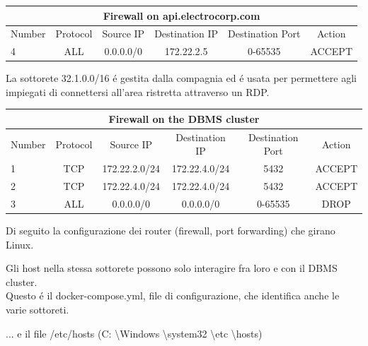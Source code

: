 \begin{center}
    \begin{tabular}{ |l|c|c|c|c|c| } 
        \hline
        \multicolumn{6}{|c|}{Firewall on api.electrocorp.com} \\
        \hline
            Number & Protocol & Source IP     & Destination IP & Destination Port & Action \\
        \hline
            4      & ALL      & 0.0.0.0/0    & 172.22.2.5     & 0-65535          & ACCEPT \\
        \hline
    \end{tabular}
\end{center}

La sottorete 32.1.0.0/16 é gestita dalla compagnia ed é usata per permettere agli impiegati di connettersi all'area ristretta attraverso un RDP.

\begin{center}
    \begin{tabular}{ |l|c|c|c|c|c| } 
        \hline
        \multicolumn{6}{|c|}{Firewall on the DBMS cluster} \\
        \hline
            Number & Protocol & Source IP     & Destination IP & Destination Port & Action \\
        \hline
            1      & TCP      & 172.22.2.0/24 & 172.22.4.0/24  & 5432             & ACCEPT \\
            2      & TCP      & 172.22.4.0/24 & 172.22.4.0/24  & 5432             & ACCEPT \\
            3      & ALL      & 0.0.0.0/0    & 0.0.0.0/0     & 0-65535          & DROP  \\
        \hline
    \end{tabular}
\end{center}

Di seguito la configurazione dei router (firewall, port forwarding) che girano Linux.



Gli host nella stessa sottorete possono solo interagire fra loro e con il DBMS cluster. \\

Questo é il docker-compose.yml, file di configurazione, che identifica anche le varie sottoreti.



... e il file /etc/hosts (C: \textbackslash Windows \textbackslash system32 \textbackslash etc \textbackslash hosts)


